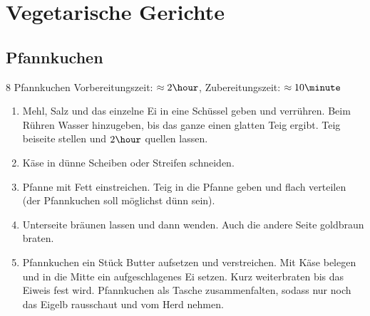 \chapter{Vegetarische Gerichte}
\section{Pfannkuchen}
8 Pfannkuchen \hfill Vorbereitungszeit: $\approx 2 \hour$, Zubereitungszeit: $\approx10 \minute$
\hspace{0em}\\
\begin{enumerate}
\item   Mehl, Salz und das einzelne Ei in eine Schüssel geben und verrühren.
        Beim Rühren Wasser hinzugeben, bis das ganze einen glatten Teig ergibt.
        Teig beiseite stellen und $2 \hour$ quellen lassen.
\item   Käse in dünne Scheiben oder Streifen schneiden.
\item   Pfanne mit Fett einstreichen.
        Teig in die Pfanne geben und flach verteilen (der Pfannkuchen soll möglichst dünn sein).
\item   Unterseite bräunen lassen und dann wenden.
        Auch die andere Seite goldbraun braten.
\item   Pfannkuchen ein Stück Butter aufsetzen und verstreichen.
        Mit Käse belegen und in die Mitte ein aufgeschlagenes Ei setzen.
        Kurz weiterbraten bis das Eiweis fest wird.
        Pfannkuchen als Tasche zusammenfalten, sodass nur noch das Eigelb rausschaut
        und vom Herd nehmen.
\end{enumerate}

